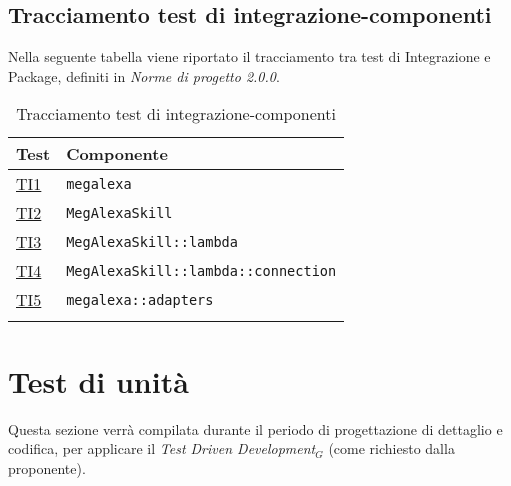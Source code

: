 \subsection{Tracciamento test di integrazione-componenti}
Nella seguente tabella viene riportato il tracciamento tra test di Integrazione e Package, definiti in \textit{Norme di progetto 2.0.0}.
\normalsize
\begin{longtable}{|>{\centering}m{3cm}|m{9cm}<{\centering}|}
\hline
\textbf{Test} & \textbf{Componente}\\
\hline
\endhead
\hyperlink{TI1}{TI1} & \texttt{megalexa}\\ \hline
\hyperlink{TI2}{TI2} & {\texttt{MegAlexaSkill}}\\ \hline
\hyperlink{TI3}{TI3} & {\texttt{MegAlexaSkill::lambda}}\\ \hline
\hyperlink{TI4}{TI4} & {\texttt{MegAlexaSkill::lambda::connection}}\\ \hline
\hyperlink{TI5}{TI5} & {\texttt{megalexa::adapters}}\\ \hline
\caption[Tracciamento test di integrazione-componenti]{Tracciamento test di integrazione-componenti}
\label{tabella:ts-requi}
\end{longtable}

\section{Test di unità}
Questa sezione verrà compilata durante il periodo di progettazione di dettaglio e codifica, per applicare il \textit{Test Driven Development$_{G}$} (come richiesto dalla proponente).